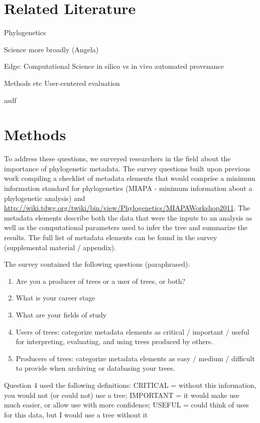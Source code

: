 \documentclass[12pt]{scrartcl}
\begin{document}
\section{Related Literature}

Phylogenetics

Science more broadly (Angela)

Edge: Computational Science
in silico vs in vivo
automated provenance

Methods etc
User-centered evaluation

\begin{compactitem}
  \item asdf
\end{compactitem}

\section{Methods}
To address these questions, we surveyed researchers in the field about the importance of phylogenetic metadata. The survey questions built upon previous work compiling a checklist of metadata elements that would comprise a minimum information standard for phylogenetics (MIAPA - minimum information about a phylogenetic analysis) \citep{Leebens-Mack2006} and \url{http://wiki.tdwg.org/twiki/bin/view/Phylogenetics/MIAPAWorkshop2011}. The metadata elements describe both the data that were the inputs to an analysis as well as the computational parameters used to infer the tree and summarize the results. The full list of metadata elements can be found in the survey (supplemental material / appendix). 

The survey contained the following questions (paraphrased):

\begin{enumerate}
\item{Are you a producer of trees or a user of trees, or both?}
\item{What is your career stage}
\item{What are your fields of study}
\item{Users of trees: categorize metadata elements as critical / important / useful for interpreting, evaluating, and using trees produced by others. }
\item{Producers of trees: categorize metadata elements as easy / medium / difficult to provide when archiving or databasing your trees. }
\end{enumerate}

Question 4 used the following definitions: CRITICAL = without this information, you would not (or could not) use a tree; IMPORTANT = it would make use much easier, or allow use with more confidence; USEFUL = could think of uses for this data, but I would use a tree without it
\end{document}
